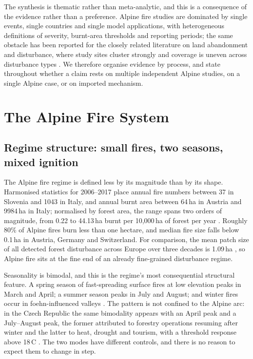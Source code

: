 \documentclass[11pt,a4paper]{article}
\begin{document}
The synthesis is thematic rather than meta-analytic, and this is a consequence of the evidence rather than a preference. Alpine fire studies are dominated by single events, single countries and single model applications, with heterogeneous definitions of severity, burnt-area thresholds and reporting periods; the same obstacle has been reported for the closely related literature on land abandonment and disturbance, where study sites cluster strongly and coverage is uneven across disturbance types \citep{mantero_influence_2020}. We therefore organise evidence by process, and state throughout whether a claim rests on multiple independent Alpine studies, on a single Alpine case, or on imported mechanism.

\tableofcontents
\newpage


\section{The Alpine Fire System}
\label{sec:system}

\subsection{Regime structure: small fires, two seasons, mixed ignition}

The Alpine fire regime is defined less by its magnitude than by its shape. Harmonised statistics for 2006--2017 place annual fire numbers between 37 in Slovenia and 1043 in Italy, and annual burnt area between 64\,ha in Austria and 9984\,ha in Italy; normalised by forest area, the range spans two orders of magnitude, from 0.22 to 44.13\,ha burnt per 10{,}000\,ha of forest per year \citep{muller_forest_2020}. Roughly 80\% of Alpine fires burn less than one hectare, and median fire size falls below 0.1\,ha in Austria, Germany and Switzerland. For comparison, the mean patch size of all detected forest disturbance across Europe over three decades is 1.09\,ha \citep{senf_mapping_2021}, so Alpine fire sits at the fine end of an already fine-grained disturbance regime.

Seasonality is bimodal, and this is the regime's most consequential structural feature. A spring season of fast-spreading surface fires at low elevation peaks in March and April; a summer season peaks in July and August; and winter fires occur in foehn-influenced valleys \citep{valese_wildfires_2011, muller_forest_2020}. The pattern is not confined to the Alpine arc: in the Czech Republic the same bimodality appears with an April peak and a July--August peak, the former attributed to forestry operations resuming after winter and the latter to heat, drought and tourism, with a threshold response above 18\,\degree C \citep{bercak_combination_2024}. The two modes have different controls, and there is no reason to expect them to change in step.
\end{document}
